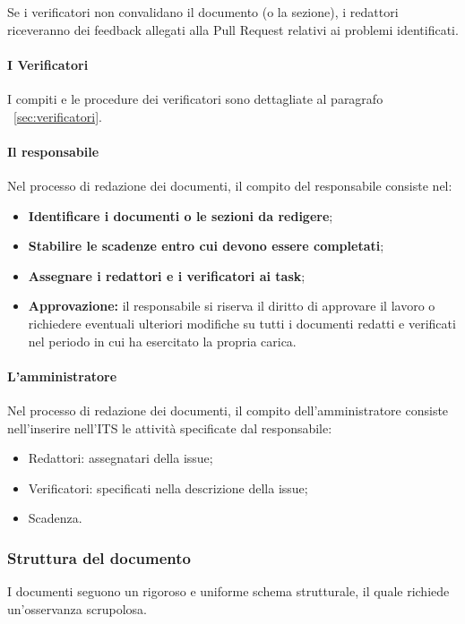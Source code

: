 Se i verificatori non convalidano il documento (o la sezione), i redattori riceveranno dei feedback allegati alla Pull Request relativi ai problemi identificati.

\paragraph{I Verificatori}
I compiti e le procedure dei verificatori sono dettagliate al paragrafo ~\ref{sec:verificatori}.

\paragraph{Il responsabile}
Nel processo di redazione dei documenti, il compito del responsabile consiste nel:
\begin{itemize}
    \item \textbf{Identificare i documenti o le sezioni da redigere};
    \item \textbf{Stabilire le scadenze entro cui devono essere completati};
    \item \textbf{Assegnare i redattori e i verificatori ai task};
    \item \textbf{Approvazione:} il responsabile si riserva il diritto di approvare il lavoro o richiedere eventuali ulteriori modifiche su tutti i documenti redatti e verificati nel periodo in cui ha esercitato la propria carica.
\end{itemize}

\paragraph{L'amministratore}
Nel processo di redazione dei documenti, il compito dell'amministratore consiste nell'inserire nell'ITS le attività specificate dal responsabile:
    \begin{itemize}
        \item Redattori: assegnatari della issue;
        \item Verificatori: specificati nella descrizione della issue;
        \item Scadenza.
    \end{itemize}

\subsubsection{Struttura del documento}
\label{subsubsec:strutturadocumento}
I documenti seguono un rigoroso e uniforme schema strutturale, il quale richiede un'osservanza scrupolosa.

